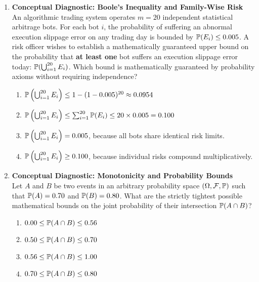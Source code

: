 \begin{enumerate}[resume]
\item \textbf{Conceptual Diagnostic: Boole's Inequality and Family-Wise Risk} \\
An algorithmic trading system operates $m = 20$ independent statistical arbitrage bots. For each bot $i$, the probability of suffering an abnormal execution slippage error on any trading day is bounded by $\P(E_i) \le 0.005$. A risk officer wishes to establish a mathematically guaranteed upper bound on the probability that \textbf{at least one} bot suffers an execution slippage error today: $\P(\bigcup_{i=1}^{20} E_i)$. Which bound is mathematically guaranteed by probability axioms without requiring independence?
\begin{enumerate}
    \item $\P\left(\bigcup_{i=1}^{20} E_i\right) \le 1 - (1 - 0.005)^{20} \approx 0.0954$
    \item $\P\left(\bigcup_{i=1}^{20} E_i\right) \le \sum_{i=1}^{20} \P(E_i) \le 20 \times 0.005 = 0.100$
    \item $\P\left(\bigcup_{i=1}^{20} E_i\right) = 0.005$, because all bots share identical risk limits.
    \item $\P\left(\bigcup_{i=1}^{20} E_i\right) \ge 0.100$, because individual risks compound multiplicatively.
\end{enumerate}

\item \textbf{Conceptual Diagnostic: Monotonicity and Probability Bounds} \\
Let $A$ and $B$ be two events in an arbitrary probability space $(\Omega, \mathcal{F}, \P)$ such that $\P(A) = 0.70$ and $\P(B) = 0.80$. What are the strictly tightest possible mathematical bounds on the joint probability of their intersection $\P(A \cap B)$?
\begin{enumerate}
    \item $0.00 \le \P(A \cap B) \le 0.56$
    \item $0.50 \le \P(A \cap B) \le 0.70$
    \item $0.56 \le \P(A \cap B) \le 1.00$
    \item $0.70 \le \P(A \cap B) \le 0.80$
\end{enumerate}
\end{enumerate}

